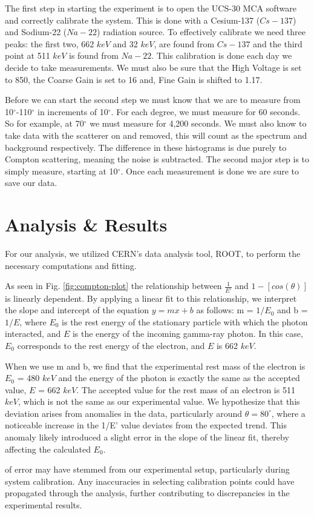 \documentclass[a4paper,12pt,english]{all-in-one} %
\begin{document}
\begin{multicols}{2}
{The first step in starting the experiment is to open the UCS-30 MCA software and correctly calibrate the system. This is done with a Cesium-137 ($Cs-137$) and Sodium-22 ($Na-22$) radiation source. To effectively calibrate we need three peaks: the first two, 662 $keV$ and 32 $keV$, are found from $Cs-137$ and the third point at 511 $keV$ is found from $Na-22$. This calibration is done each day we decide to take measurements. We must also be sure that the High Voltage is set to 850, the Coarse Gain is set to 16 and, Fine Gain is shifted to 1.17.

Before we can start the second step we must know that we are to measure from 10$^\circ$-110$^\circ$ in increments of 10$^\circ$. For each degree, we must measure for 60 seconds. So for example, at 70$^\circ$ we must measure for 4,200 seconds. We must also know to take data with the scatterer on and removed, this will count as the spectrum and background respectively. The difference in these histograms is due purely to Compton scattering, meaning the noise is subtracted. The second major step is to simply measure, starting at 10$^\circ$. Once each measurement is done we are sure to save our data.  
}

\section*{Analysis \& Results}
{
For our analysis, we utilized CERN's data analysis tool, ROOT, to perform the necessary computations and fitting.

As seen in Fig. \ref{fig:compton-plot} the relationship between $\frac{1}{E'}$ and $1-[cos(\theta)]$ is linearly dependent. By applying a linear fit to this relationship, we interpret the slope and intercept of the equation $y=mx+b$ as follows: m = $1/E_0$ and b = $1/E$, where $E_0$ is the rest energy of the stationary particle with which the photon interacted, and $E$ is the energy of the incoming gamma-ray photon. In this case, $E_0$ corresponds to the rest energy of the electron, and $E$ is 662 $keV$.

When we use m and b, we find that the experimental rest mass of the electron is $E_0$ = 480 $keV$ and the energy of the photon is exactly the same as the accepted value, $E$ = 662 $keV$. The accepted value for the rest mass of an electron is 511 $keV$, which is not the same as our experimental value. We hypothesize that this deviation arises from anomalies in the data, particularly around $\theta = 80^{\circ}$, where a noticeable increase in the 1/E' value deviates from the expected trend. This anomaly likely introduced a slight error in the slope of the linear fit, thereby affecting the calculated $E_0$.

of error may have stemmed from our experimental setup, particularly during system calibration. Any inaccuracies in selecting calibration points could have propagated through the analysis, further contributing to discrepancies in the experimental results.

}
\end{multicols}
\end{document}
